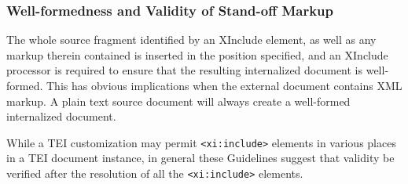 \subsubsection[{Well-formedness and Validity of Stand-off Markup}]{Well-formedness and Validity of Stand-off Markup}\label{SASOva}\par
The whole source fragment identified by an XInclude element, as well as any markup therein contained is inserted in the position specified, and an XInclude processor is required to ensure that the resulting internalized document is well-formed. This has obvious implications when the external document contains XML markup. A plain text source document will always create a well-formed internalized document. \par
While a TEI customization may permit \texttt{<xi:include>} elements in various places in a TEI document instance, in general these Guidelines suggest that validity be verified after the resolution of all the \texttt{<xi:include>} elements.
